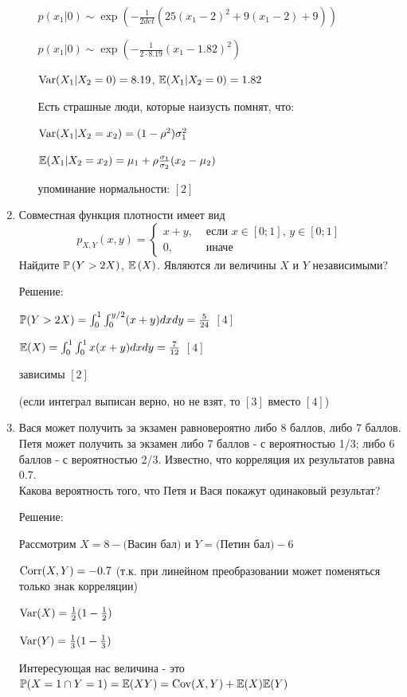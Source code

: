\documentclass[12pt, a4paper]{article}\usepackage[]{graphicx}\usepackage[]{color}
\begin{document}
\begin{enumerate}
\begin{enumerate}
$p(x_{1}|0)\sim \exp\left(-\frac{1}{2det}(25(x_{1}-2)^{2}+9(x_{1}-2)+9)\right)$

$p(x_{1}|0)\sim \exp\left(-\frac{1}{2\cdot 8.19}(x_{1}-1.82)^{2}\right)$

$\Var(X_{1}|X_{2}=0)=8.19$, $\E(X_{1}|X_{2}=0)=1.82$

Есть страшные люди, которые наизусть помнят, что:

$\Var(X_{1}|X_{2}=x_{2})=(1-\rho^{2})\sigma_{1}^{2}$

$\E(X_{1}|X_{2}=x_{2})=\mu_{1} + \rho\frac{\sigma_{1}}{\sigma_{2}}(x_{2}-\mu_{2})$

упоминание нормальности: $[2]$
\end{enumerate}

\item Совместная функция плотности имеет вид
\[
p_{X,Y} \left(x,y\right)=
\begin{cases}
x+y, & \text{ если } x\in \left[0;1\right],\, y\in \left[0;1\right] \\
0, & \text{ иначе}
\end{cases}
\]
Найдите  $\P\left(Y>2X\right)$, $\E\left(X\right)$. Являются ли величины $X$ и $Y$ независимыми?

Решение:

$\P(Y>2X)=\int_{0}^{1}\int_{0}^{y/2}(x+y)dxdy=\frac{5}{24}$ $[4]$

$\E(X)=\int_{0}^{1}\int_{0}^{1}x(x+y)dxdy=\frac{7}{12}$ $[4]$

зависимы $[2]$

(если интеграл выписан верно, но не взят, то $[3]$ вместо $[4]$)

\item Вася может получить за экзамен равновероятно либо 8 баллов, либо 7 баллов. Петя может получить за экзамен либо 7 баллов - с вероятностью 1/3; либо 6 баллов - с вероятностью 2/3. Известно, что корреляция их результатов равна 0.7. \\
Какова вероятность того, что Петя и Вася покажут одинаковый результат?

Решение:

Рассмотрим $X=8-($Васин бал$)$ и $Y=($Петин бал$)-6$

$\Corr(X,Y)=-0.7$ (т.к. при линейном преобразовании может поменяться только знак корреляции)

$\Var(X)=\frac{1}{2}(1-\frac{1}{2})$

$\Var(Y)=\frac{1}{3}(1-\frac{1}{3})$

Интересующая нас величина - это $\P(X=1\cap Y=1)=\E(XY)=\Cov(X,Y)+\E(X)\E(Y)$


\end{enumerate}
\end{document}
